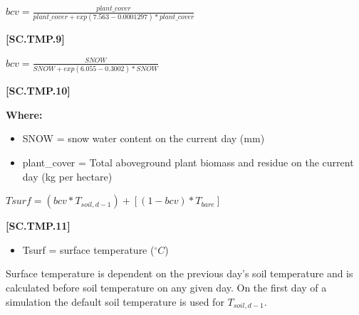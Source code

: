    \begin{center}
\(bcv= \frac{plant\_cover}{plant\_cover+exp(7.563-0.0001297) * plant\_cover}\)
    \end{center}
        \vspace{0.5cm} 
    
            {\raggedleft \textbf{[SC.TMP.9]}\par}
            \vspace{0.5cm}

    \begin{center}
\(bcv=\frac{SNOW}{SNOW+exp(6.055-0.3002) * SNOW}\)
    \end{center}
        \vspace{0.5cm} 
    
            {\raggedleft \textbf{[SC.TMP.10]}\par}
            \vspace{0.5cm}

        \textbf{Where:}
        
            
        \begin{itemize}
            \item SNOW	=	snow water content on the current day (mm)	
            \item plant\_cover = Total aboveground plant biomass and residue on the current day (kg per hectare)

        \end{itemize}
            \vspace{0.5cm}

    \begin{center}
\(Tsurf = (bcv * T_{soil,d-1})+ [(1-bcv) * T_{bare}]\)
    \end{center}
        \vspace{0.5cm} 
    
            {\raggedleft \textbf{[SC.TMP.11]}\par}
            \vspace{0.5cm}
            
        \begin{itemize}
            \item Tsurf	=	surface temperature (\(^\circ C\))
        \end{itemize}
\vspace{0.2cm}

Surface temperature is dependent on the previous day’s soil temperature and is calculated before soil temperature on any given day. On the first day of a simulation the default soil temperature is used for \(T_{soil,d-1}\).
\vspace{0.5cm}

